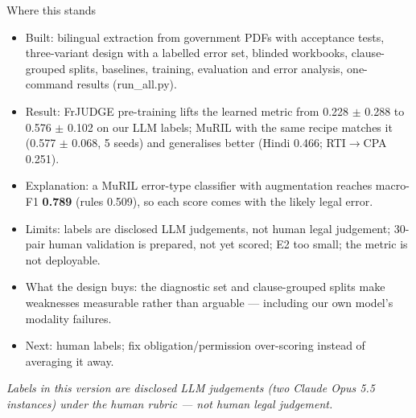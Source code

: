 \documentclass[aspectratio=169,11pt]{beamer}
\newcommand{\slidenote}[1]{\vfill\parbox{0.9\textwidth}{\scriptsize\itshape\color{flag}#1}\par}
\begin{document}
\begin{frame}{Where this stands}
\footnotesize
\begin{itemize}
\item Built: bilingual extraction from government PDFs with acceptance tests, three-variant design with a labelled error set, blinded workbooks, clause-grouped splits, baselines, training, evaluation and error analysis, one-command results (run\_all.py).
\item Result: FrJUDGE pre-training lifts the learned metric from 0.228 \ensuremath{\pm} 0.288 to 0.576 \ensuremath{\pm} 0.102 on our LLM labels; MuRIL with the same recipe matches it (0.577 \ensuremath{\pm} 0.068, 5 seeds) and generalises better (Hindi 0.466; RTI\ensuremath{\rightarrow}CPA 0.251).
\item Explanation: a MuRIL error-type classifier with augmentation reaches macro-F1 \textbf{0.789} (rules 0.509), so each score comes with the likely legal error.
\item Limits: labels are disclosed LLM judgements, not human legal judgement; 30-pair human validation is prepared, not yet scored; E2 too small; the metric is not deployable.
\item What the design buys: the diagnostic set and clause-grouped splits make weaknesses measurable rather than arguable — including our own model's modality failures.
\item Next: human labels; fix obligation/permission over-scoring instead of averaging it away.
\end{itemize}
\slidenote{Labels in this version are disclosed LLM judgements (two Claude Opus 5.5 instances) under the human rubric — not human legal judgement.}
\end{frame}
\end{document}
